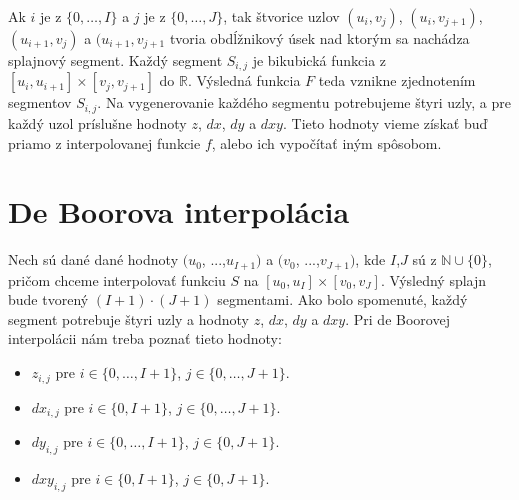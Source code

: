 \documentclass{rnthesis}
\newcommand{\uinteger}{$\mathbb{N} \cup \{0\}$}
\begin{document}

Ak $i$ je z  $\{0, \dots, I\}$ a $j$ je z $\{0, \dots, J\}$, tak štvorice uzlov $(u_i, v_j)$, $(u_i, v_{j+1})$, $(u_{i+1}, v_j)$ a $(u_{i+1}, v_{j+1}$ tvoria obdĺžnikový úsek nad ktorým sa nachádza splajnový segment. Každý segment $S_{i,j}$ je bikubická funkcia z $[u_i, u_{i+1}] \times [v_j, v_{j+1}]$ do $\mathbb{R}$. Výsledná funkcia $F$ teda vznikne zjednotením segmentov $S_{i,j}$. Na vygenerovanie každého segmentu potrebujeme štyri uzly, a pre každý uzol príslušne hodnoty $z$, $dx$, $dy$ a $dxy$. Tieto hodnoty vieme získať buď priamo z interpolovanej funkcie $f$, alebo ich vypočítať iným spôsobom.

\section*{De Boorova interpolácia}

Nech sú dané dané hodnoty $(u_0$, ...,$u_{I+1})$ a $(v_0$, ...,$v_{J+1})$, kde $I$,$J$ sú z \uinteger, pričom chceme interpolovať funkciu $S$ na $[u_0, u_I] \times [v_0, v_J]$. Výsledný splajn bude tvorený $(I+1) \cdot (J+1)$ segmentami. Ako bolo spomenuté, každý segment potrebuje štyri uzly a hodnoty $z$, $dx$, $dy$ a $dxy$. Pri de Boorovej interpolácii nám treba poznať tieto hodnoty:
\begin{itemize}
	\item
	$z_{i,j}$ pre $i \in \{0, \dots, I+1\}$, $j \in \{0, \dots, J+1\}$.
	\item
	$dx_{i,j}$ pre $i \in \{0, I+1\}$, $j \in \{0, \dots, J+1\}$.
	\item
	$dy_{i,j}$ pre $i \in \{0, \dots, I+1\}$, $j \in \{0, J+1\}$.
	\item
	$dxy_{i,j}$ pre $i \in \{0, I+1\}$, $j \in \{0, J+1\}$.
\end{itemize}
\end{document}
